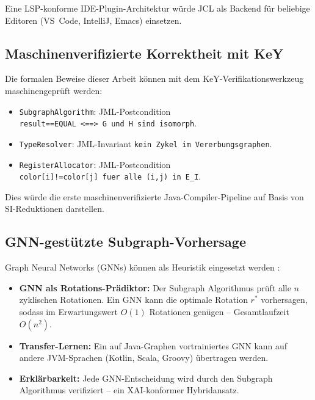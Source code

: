 ﻿\documentclass[a4paper,12pt]{article}
\theoremstyle{definition}
\begin{document}
Eine LSP-konforme IDE-Plugin-Architektur w\"urde JCL als Backend
f\"ur beliebige Editoren (VS~Code, IntelliJ, Emacs) einsetzen.

\subsection{Maschinenverifizierte Korrektheit mit KeY}

Die formalen Beweise dieser Arbeit k\"onnen mit dem KeY-Verifikations\-werkzeug
\cite{key2024} maschinengepr\"uft werden:

\begin{itemize}
    \item \texttt{SubgraphAlgorithm}: JML-Postcondition\\
          \texttt{result==EQUAL <==> G und H sind isomorph}.
    \item \texttt{TypeResolver}: JML-Invariant
          \texttt{kein Zykel im Vererbungsgraphen}.
    \item \texttt{RegisterAllocator}: JML-Postcondition\\
          \texttt{color[i]!=color[j] fuer alle (i,j) in E\_I}.
\end{itemize}

Dies w\"urde die erste maschinenverifizierte Java-Compiler-Pipeline
auf Basis von SI-Reduktionen darstellen.

\subsection{GNN-gest\"utzte Subgraph-Vorhersage}

Graph Neural Networks (GNNs) k\"onnen als Heuristik eingesetzt werden
\cite{hamilton2020}:

\begin{itemize}
    \item \textbf{GNN als Rotations-Pr\"adiktor:} Der Subgraph
          Algorithmus pr\"uft alle $n$ zyklischen Rotationen.  Ein
          GNN kann die optimale Rotation $r^*$ vorhersagen, sodass
          im Erwartungswert $O(1)$ Rotationen gen\"ugen --
          Gesamtlaufzeit $O(n^2)$.
    \item \textbf{Transfer-Lernen:} Ein auf Java-Graphen vortrainiertes
          GNN kann auf andere JVM-Sprachen (Kotlin, Scala, Groovy)
          \"ubertragen werden.
    \item \textbf{Erkl\"arbarkeit:} Jede GNN-Entscheidung wird durch
          den Subgraph Algorithmus verifiziert -- ein XAI-konformer
          Hybridansatz.
\end{itemize}
\end{document}
